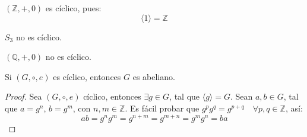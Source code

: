\begin{eje}
	$(\mathbb{Z}, +, 0)$ es cíclico, pues:
	\begin{equation*}
		\langle 1 \rangle = \mathbb{Z}
	\end{equation*}
\end{eje}

\begin{eje}
	$S_3$ no es cíclico.
\end{eje}

\begin{eje}
	$(\mathbb{Q}, +, 0)$ no es cíclico.
\end{eje}


\begin{prop}
	Si $(G, \circ, e)$ es cíclico, entonces $G$ es abeliano.
\end{prop}

\begin{proof}
	Sea $(G, \circ, e)$ cíclico, entonces $\exists g \in G$, tal que $\langle g \rangle = G$. Sean $a, b \in G$, tal que $a = g^n$, $b = g^m$, con $n, m \in \mathbb{Z}$. Es fácil probar que $g^p g^q = g^{p+q} \quad \forall p, q \in \mathbb{Z}$, así:
	\begin{equation*}
		ab = g^n g^m = g^{n+m} = g^{m+n} = g^m g^n = ba
	\end{equation*}
\end{proof}

